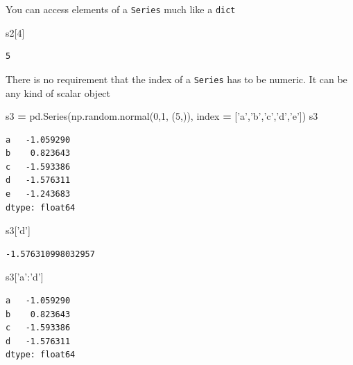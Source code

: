 \documentclass[
  letterpaper,
]{scrbook}
\newenvironment{Shaded}{\begin{snugshade}}{\end{snugshade}}
\newcommand{\DecValTok}[1]{\textcolor[rgb]{0.00,0.00,0.81}{#1}}
\newcommand{\NormalTok}[1]{#1}
\newcommand{\OperatorTok}[1]{\textcolor[rgb]{0.81,0.36,0.00}{\textbf{#1}}}
\newcommand{\StringTok}[1]{\textcolor[rgb]{0.31,0.60,0.02}{#1}}
\begin{document}
You can access elements of a \texttt{Series} much like a \texttt{dict}

\begin{Shaded}
\begin{Highlighting}[]
\NormalTok{s2[}\DecValTok{4}\NormalTok{]}
\end{Highlighting}
\end{Shaded}

\begin{verbatim}
5
\end{verbatim}

There is no requirement that the index of a \texttt{Series} has to be numeric. It can be any kind of scalar object

\begin{Shaded}
\begin{Highlighting}[]
\NormalTok{s3 }\OperatorTok{=}\NormalTok{ pd.Series(np.random.normal(}\DecValTok{0}\NormalTok{,}\DecValTok{1}\NormalTok{, (}\DecValTok{5}\NormalTok{,)), index }\OperatorTok{=}\NormalTok{ [}\StringTok{'a'}\NormalTok{,}\StringTok{'b'}\NormalTok{,}\StringTok{'c'}\NormalTok{,}\StringTok{'d'}\NormalTok{,}\StringTok{'e'}\NormalTok{])}
\NormalTok{s3}
\end{Highlighting}
\end{Shaded}

\begin{verbatim}
a   -1.059290
b    0.823643
c   -1.593386
d   -1.576311
e   -1.243683
dtype: float64
\end{verbatim}

\begin{Shaded}
\begin{Highlighting}[]
\NormalTok{s3[}\StringTok{'d'}\NormalTok{]}
\end{Highlighting}
\end{Shaded}

\begin{verbatim}
-1.576310998032957
\end{verbatim}

\begin{Shaded}
\begin{Highlighting}[]
\NormalTok{s3[}\StringTok{'a'}\NormalTok{:}\StringTok{'d'}\NormalTok{]}
\end{Highlighting}
\end{Shaded}

\begin{verbatim}
a   -1.059290
b    0.823643
c   -1.593386
d   -1.576311
dtype: float64
\end{verbatim}
\end{document}
